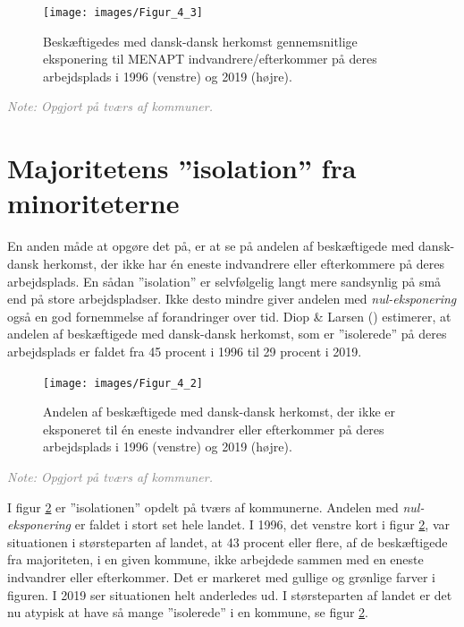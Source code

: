 \documentclass[
]{book}
\begin{document}
\newpage

\begin{figure}
\texttt{[image: images/Figur\_4\_3]} \caption{Beskæftigedes med dansk-dansk herkomst gennemsnitlige eksponering til MENAPT indvandrere/efterkommer på deres arbejdsplads i 1996 (venstre) og 2019 (højre).}\label{fig:fig-5-3}
\end{figure}

\begin{footnotesize}\textit{\textcolor{gray}{
Note: Opgjort på tværs af kommuner.
}}
\end{footnotesize}

\section{Majoritetens ''isolation'' fra minoriteterne}\label{majoritetens-isolation-fra-minoriteterne}

En anden måde at opgøre det på, er at se på andelen af beskæftigede med dansk-dansk herkomst, der ikke har én eneste indvandrere eller efterkommere på deres arbejdsplads. En sådan ''isolation'' er selvfølgelig langt mere sandsynlig på små end på store arbejdspladser. Ikke desto mindre giver andelen med \emph{nul-eksponering} også en god fornemmelse af forandringer over tid. Diop \& Larsen () estimerer, at andelen af beskæftigede med dansk-dansk herkomst, som er ''isolerede'' på deres arbejdsplads er faldet fra 45 procent i 1996 til 29 procent i 2019.

\newpage
\begin{figure}
\texttt{[image: images/Figur\_4\_2]} \caption{Andelen af beskæftigede med dansk-dansk herkomst, der ikke er eksponeret til én eneste indvandrer eller efterkommer på deres arbejdsplads i 1996 (venstre) og 2019 (højre).}\label{fig:fig-5-4}
\end{figure}

\begin{footnotesize}\textit{\textcolor{gray}{
Note: Opgjort på tværs af kommuner.
}}
\end{footnotesize}

I figur \ref{fig:fig-5-4} er ''isolationen'' opdelt på tværs af kommunerne. Andelen med \emph{nul-eksponering} er faldet i stort set hele landet. I 1996, det venstre kort i figur \ref{fig:fig-5-4}, var situationen i størsteparten af landet, at 43 procent eller flere, af de beskæftigede fra majoriteten, i en given kommune, ikke arbejdede sammen med en eneste indvandrer eller efterkommer. Det er markeret med gullige og grønlige farver i figuren. I 2019 ser situationen helt anderledes ud. I størsteparten af landet er det nu atypisk at have så mange ''isolerede'' i en kommune, se figur \ref{fig:fig-5-4}.
\end{document}
